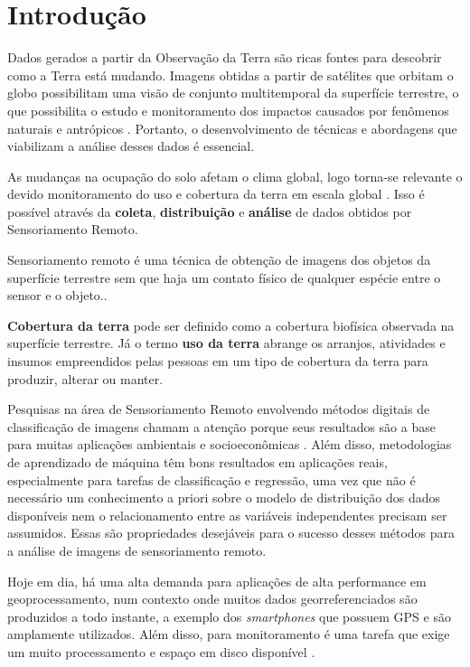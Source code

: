 \chapter{Introdução}\label{introducao}

Dados gerados a partir da Observação da Terra são ricas fontes para
descobrir como a Terra está mudando. Imagens obtidas a partir de
satélites que orbitam o globo possibilitam uma visão de conjunto
multitemporal da superfície terrestre, o que possibilita o estudo e
monitoramento dos impactos causados por fenômenos naturais e antrópicos \cite{florenzano2002imagens}. Portanto, o desenvolvimento de técnicas e abordagens que viabilizam a análise desses dados é essencial.

As mudanças na ocupação do solo afetam o clima global, logo torna-se
relevante o devido monitoramento do uso e cobertura da terra em escala
global \cite{wulder2014satellites}. Isso é possível através da \textbf{coleta}, \textbf{distribuição} e \textbf{análise} de dados obtidos por Sensoriamento Remoto.

\begin{citacao}
Sensoriamento remoto é uma técnica de obtenção de imagens dos objetos
da superfície terrestre sem que haja um contato físico de qualquer
espécie entre o sensor e o objeto.\cite[p. 3]{meneses2012introduccao}.
\end{citacao}

\textbf{Cobertura da terra} pode ser definido como a cobertura biofísica observada na superfície terrestre. Já o termo \textbf{uso da terra} abrange os arranjos, atividades e insumos empreendidos pelas pessoas em um tipo de cobertura da terra para produzir, alterar ou manter. \cite{di2016land} 
 
Pesquisas na área de Sensoriamento Remoto envolvendo métodos digitais de classificação de imagens chamam a atenção porque seus resultados são a base para
muitas aplicações ambientais e socioeconômicas \cite{lu-weng}. Além
disso, metodologias de aprendizado de máquina têm bons resultados em
aplicações reais, especialmente para tarefas de classificação e
regressão, uma vez que não é necessário um conhecimento a priori sobre o modelo de distribuição dos dados disponíveis nem o relacionamento entre as variáveis independentes precisam ser assumidos. Essas são
propriedades desejáveis para o sucesso desses métodos para a análise de
imagens de sensoriamento remoto. \cite{waske2009machine}

Hoje em dia, há uma alta demanda para aplicações de alta performance
em geoprocessamento, num contexto onde muitos dados georreferenciados
são produzidos a todo instante, a exemplo dos \emph{smartphones} que
possuem GPS e são amplamente utilizados. Além disso,  para
monitoramento é uma tarefa que exige um muito processamento e espaço em
disco disponível \cite{geocompr}.

